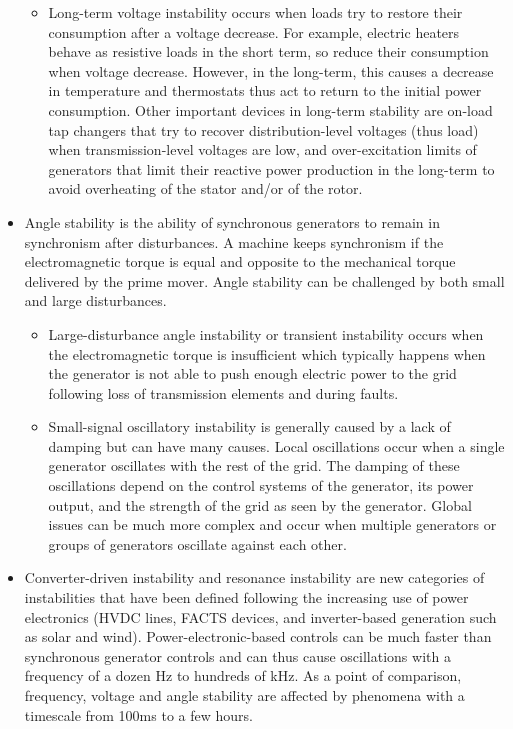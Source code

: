 \begin{itemize}
\begin{itemize}
        \item Long-term voltage instability occurs when loads try to restore their consumption after a voltage decrease. For example, electric heaters behave as resistive loads in the short term, so reduce their consumption when voltage decrease. However, in the long-term, this causes a decrease in temperature and thermostats thus act to return to the initial power consumption. Other important devices in long-term stability are on-load tap changers that try to recover distribution-level voltages (thus load) when transmission-level voltages are low, and over-excitation limits of generators that limit their reactive power production in the long-term to avoid overheating of the stator and/or of the rotor.
    \end{itemize}
    \item Angle stability is the ability of synchronous generators to remain in synchronism after disturbances. A machine keeps synchronism if the electromagnetic torque is equal and opposite to the mechanical torque delivered by the prime mover. Angle stability can be challenged by both small and large disturbances.
    \begin{itemize}
        \item Large-disturbance angle instability or transient instability occurs when the electromagnetic torque is insufficient which typically happens when the generator is not able to push enough electric power to the grid following loss of transmission elements and during faults.
        \item Small-signal oscillatory instability is generally caused by a lack of damping but can have many causes. Local oscillations occur when a single generator oscillates with the rest of the grid. The damping of these oscillations depend on the control systems of the generator, its power output, and the strength of the grid as seen by the generator. Global issues can be much more complex and occur when multiple generators or groups of generators oscillate against each other.
    \end{itemize}
    \item Converter-driven instability and resonance instability are new categories of instabilities that have been defined following the increasing use of power electronics (HVDC lines, FACTS devices, and inverter-based generation such as solar and wind). Power-electronic-based controls can be much faster than synchronous generator controls and can thus cause oscillations with a frequency of a dozen Hz to hundreds of kHz. As a point of comparison, frequency, voltage and angle stability are affected by phenomena with a timescale from 100ms to a few hours.
\end{itemize}

